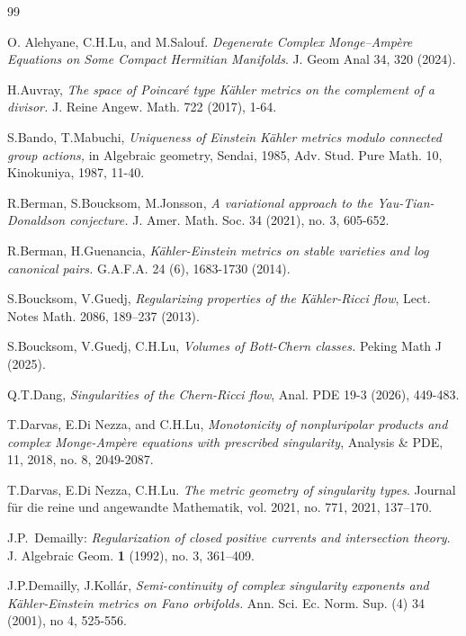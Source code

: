 \documentclass[11pt]{amsart}
\numberwithin{equation}{section}
\begin{document}
 \begin{thebibliography}{99}

 O.
Alehyane, C.H.Lu, and M.Salouf. 
{\it Degenerate Complex Monge–Ampère Equations on Some Compact Hermitian Manifolds}. 
J. Geom Anal 34, 320 (2024). 

 H.Auvray,
{\em The space of Poincar\'e type K\"ahler metrics on the complement of a divisor. }
J. Reine Angew. Math. 722 (2017), 1-64.
 
  S.Bando, T.Mabuchi,
 {\em Uniqueness of Einstein K\"ahler metrics modulo connected group actions,}
  in Algebraic geometry, Sendai, 1985, Adv. Stud. Pure Math. 10, Kinokuniya, 1987, 11-40.
 


 R.Berman, S.Boucksom, M.Jonsson, 
{\em A variational approach to the Yau-Tian-Donaldson conjecture.}
 J. Amer. Math. Soc. 34 (2021), no. 3, 605-652. 
 
  R.Berman,  H.Guenancia,
{\em K\"ahler-Einstein metrics on stable varieties and log canonical pairs.}
G.A.F.A. 24 (6), 1683-1730 (2014).



 S.Boucksom, V.Guedj, {\it Regularizing properties of the K\"ahler-Ricci flow}, Lect. Notes Math. 2086, 189--237 (2013). 

 
 S.Boucksom, V.Guedj, C.H.Lu,  
{\em Volumes of Bott-Chern classes.}
 Peking Math J (2025). 
  

 Q.T.Dang, {\it Singularities of the Chern-Ricci flow}, Anal. PDE 19-3 (2026), 449-483.
 
 
  
   T.Darvas, E.Di Nezza, and C.H.Lu,
   {\em Monotonicity of nonpluripolar products and complex {M}onge-{A}mp\`ere equations with prescribed singularity}, 
   {Analysis \& PDE}, {11}, {2018}, no. {8}, {2049-2087}.

  T.Darvas, E.Di Nezza, C.H.Lu. 
 {\it The metric geometry of singularity types}. 
 Journal f\"ur die reine und angewandte Mathematik, vol. 2021, no. 771, 2021, 137--170. 
                     
 
 J.P.~Demailly: 
{\em Regularization of closed positive currents and intersection theory}. 
J. Algebraic Geom.  {\bf 1}  (1992),  no. 3, 361--409. 

 
 J.P.Demailly, J.Koll\'ar, 
{\em Semi-continuity of complex singularity exponents and K\"ahler-Einstein metrics on Fano orbifolds.} 
Ann. Sci. Ec. Norm. Sup. (4) { 34} (2001), no 4, 525-556.



\end{thebibliography}
\end{document}
